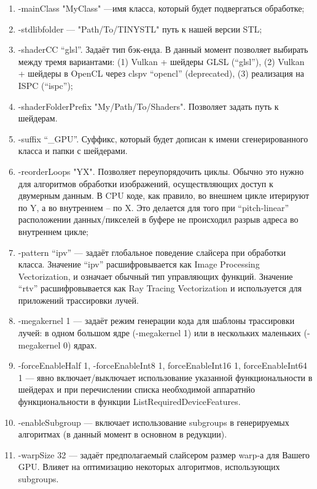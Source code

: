 \documentclass[11pt,fleqn,english,russian]{report} %
\begin{document}
\begin{enumerate}
\item -mainClass "MyClass" \thinspace---\thinspace имя класса, который будет подвергаться обработке;
\item -stdlibfolder --- "Path/To/TINYSTL" путь к нашей версии STL;

\item -shaderCC ``glsl''. Задаёт тип бэк-енда. В данный момент позволяет выбирать между тремя вариантами: (1) Vulkan + шейдеры GLSL (``glsl''), (2) Vulkan + шейдеры в OpenCL через clspv ``opencl'' (deprecated), (3) реализация на ISPC (``ispc''); 

\item -shaderFolderPrefix "My/Path/To/Shaders". Позволяет задать путь к шейдерам. 

\item -suffix ``\_GPU''. Суффикс, который будет дописан к имени сгенерированного класса и папки с шейдерами.

\item -reorderLoops "YX". Позволяет переупорядочить циклы. Обычно это нужно для алгоритмов обработки изображений, осуществляющих доступ к двумерным данным. В CPU коде, как правило, во внешнем цикле итерируют по Y, а во внутреннем -- по X. Это делается для того при ``pitch-linear'' расположении данных/пикселей в буфере не происходил  разрыв адреса во внутреннем цикле;

\item -pattern ``ipv'' --- задаёт глобальное поведение слайсера при обработки класса. Значение ``ipv'' расшифровывается как Image Processing Vectorization, и означает обычный тип управляющих функций. Значение ``rtv'' расшифровывается как Ray Tracing Vectorization и используется для приложений трассировки лучей.

\item -megakernel 1 --- задаёт режим генерации кода для шаблоны трассировки лучей: в одном большом ядре (-megakernel 1) или в нескольких маленьких (-megakernel 0) ядрах.

\item -forceEnableHalf 1, -forceEnableInt8 1, forceEnableInt16 1, forceEnableInt64 1 --- явно включает/выключает использование указанной функциональности в шейдерах и при перечислении списка необходимой аппаратнйо функциональности в функции ListRequiredDeviceFeatures.

\item -enableSubgroup --- включает использование subgroups в генерируемых алгоритмах (в данный момент в основном в редукции).

\item -warpSize 32 --- задаёт предполагаемый слайсером размер warp-а для Вашего GPU. Влияет на оптимизацию некоторых алгоритмов, использующих subgroups.

\end{enumerate}
\end{document}
